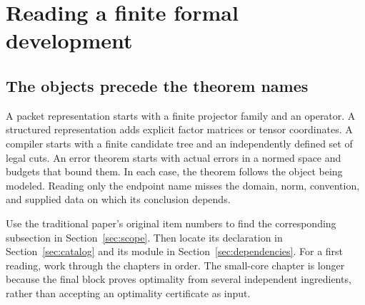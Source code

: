 \section{Reading a finite formal development}
\subsection{The objects precede the theorem names}
A packet representation starts with a finite projector family and an operator. A structured representation adds explicit factor matrices or tensor coordinates. A compiler starts with a finite candidate tree and an independently defined set of legal cuts. An error theorem starts with actual errors in a normed space and budgets that bound them. In each case, the theorem follows the object being modeled. Reading only the endpoint name misses the domain, norm, convention, and supplied data on which its conclusion depends.

Use the traditional paper's original item numbers to find the corresponding subsection in Section~\ref{sec:scope}. Then locate its declaration in Section~\ref{sec:catalog} and its module in Section~\ref{sec:dependencies}. For a first reading, work through the chapters in order. The small-core chapter is longer because the final block proves optimality from several independent ingredients, rather than accepting an optimality certificate as input.


